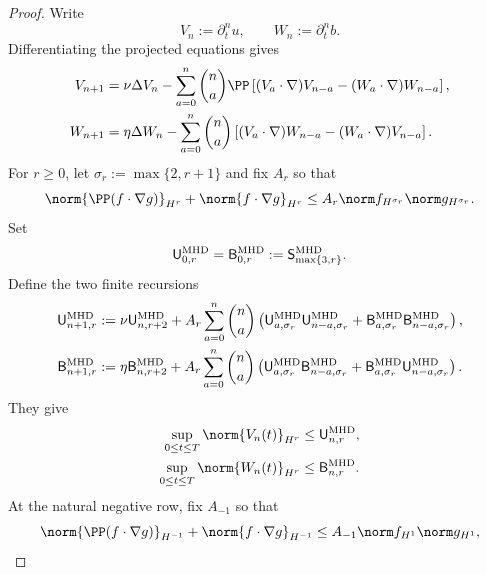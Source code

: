 \begin{proof}
Write
\begin{equation}
 V_n:=\partial_t^nu,
 \qquad W_n:=\partial_t^nb.
 \label{eq:mhd-row-notation}
\end{equation}
Differentiating the projected equations gives
\begin{align}
 V_{n+1}
 &={}\nu\Delta V_n
 -\sum_{a=0}^n\binom na\PP\left[
   (V_a\cdot\nabla)V_{n-a}
   -(W_a\cdot\nabla)W_{n-a}
 \right],
 \label{eq:mhd-velocity-recurrence}\\
 W_{n+1}
 &={}\eta\Delta W_n
 -\sum_{a=0}^n\binom na\left[
   (V_a\cdot\nabla)W_{n-a}
   -(W_a\cdot\nabla)V_{n-a}
 \right].
 \label{eq:mhd-magnetic-recurrence}
\end{align}
For \(r\ge0\), let \(\sigma_r:=\max\{2,r+1\}\) and fix \(A_r\) so that
\begin{equation}
 \norm{\PP(f\cdot\nabla g)}_{H^r}
 +\norm{f\cdot\nabla g}_{H^r}
 \le A_r\norm f_{H^{\sigma_r}}\norm g_{H^{\sigma_r}}.
 \label{eq:mhd-row-product}
\end{equation}
Set
\begin{equation}
 \mathsf U_{0,r}^{\rm MHD}
 =\mathsf B_{0,r}^{\rm MHD}
 :=\mathsf S_{\max\{3,r\}}^{\rm MHD}.
 \label{eq:mhd-row-base}
\end{equation}
Define the two finite recursions
\begin{align}
 \mathsf U_{n+1,r}^{\rm MHD}
 &:={}\nu\mathsf U_{n,r+2}^{\rm MHD}
 +A_r\sum_{a=0}^n\binom na\left(
  \mathsf U_{a,\sigma_r}^{\rm MHD}
  \mathsf U_{n-a,\sigma_r}^{\rm MHD}
  +\mathsf B_{a,\sigma_r}^{\rm MHD}
  \mathsf B_{n-a,\sigma_r}^{\rm MHD}
 \right),
 \label{eq:mhd-velocity-envelope}\\
 \mathsf B_{n+1,r}^{\rm MHD}
 &:={}\eta\mathsf B_{n,r+2}^{\rm MHD}
 +A_r\sum_{a=0}^n\binom na\left(
  \mathsf U_{a,\sigma_r}^{\rm MHD}
  \mathsf B_{n-a,\sigma_r}^{\rm MHD}
  +\mathsf B_{a,\sigma_r}^{\rm MHD}
  \mathsf U_{n-a,\sigma_r}^{\rm MHD}
 \right).
 \label{eq:mhd-magnetic-envelope}
\end{align}
They give
\begin{align}
 \sup_{0\le t\le T}\norm{V_n(t)}_{H^r}
 &\le\mathsf U_{n,r}^{\rm MHD},
 \label{eq:mhd-velocity-bound}\\
 \sup_{0\le t\le T}\norm{W_n(t)}_{H^r}
 &\le\mathsf B_{n,r}^{\rm MHD}.
 \label{eq:mhd-magnetic-bound}
\end{align}
At the natural negative row, fix \(A_{-1}\) so that
\begin{equation}
 \norm{\PP(f\cdot\nabla g)}_{H^{-1}}
 +\norm{f\cdot\nabla g}_{H^{-1}}
 \le A_{-1}\norm f_{H^1}\norm g_{H^1},

\end{equation}
\end{proof}

